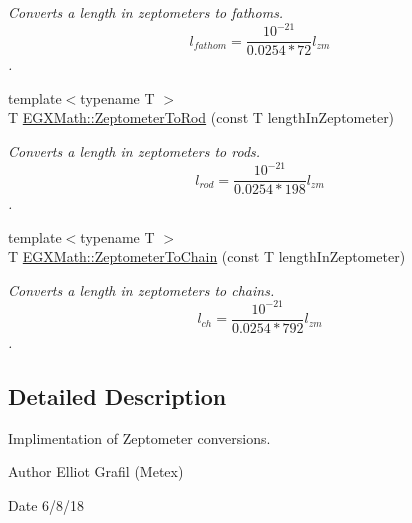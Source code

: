 \begin{DoxyCompactItemize}
\begin{DoxyCompactList}\small\item\em Converts a length in zeptometers to fathoms. \[ l_{fathom}= \frac{10^{-21}}{0.0254 * 72} l_{zm} \]. \end{DoxyCompactList}\item 
{\footnotesize template$<$typename T $>$ }\\T \mbox{\hyperlink{group___e_g_x_math-_conversions-_length_conversions-_s_i-_zeptometer-_surveyors_gac0c6193e55739ec7f4c3769ebddb65e2}{E\+G\+X\+Math\+::\+Zeptometer\+To\+Rod}} (const T length\+In\+Zeptometer)
\begin{DoxyCompactList}\small\item\em Converts a length in zeptometers to rods. \[ l_{rod}= \frac{10^{-21}}{0.0254 * 198} l_{zm} \]. \end{DoxyCompactList}\item 
{\footnotesize template$<$typename T $>$ }\\T \mbox{\hyperlink{group___e_g_x_math-_conversions-_length_conversions-_s_i-_zeptometer-_surveyors_gaf9fce38080eb9c090004c9df2a5dead1}{E\+G\+X\+Math\+::\+Zeptometer\+To\+Chain}} (const T length\+In\+Zeptometer)
\begin{DoxyCompactList}\small\item\em Converts a length in zeptometers to chains. \[ l_{ch}= \frac{10^{-21}}{0.0254 * 792} l_{zm} \]. \end{DoxyCompactList}\end{DoxyCompactItemize}


\subsection{Detailed Description}
Implimentation of Zeptometer conversions. 

\begin{DoxyAuthor}{Author}
Elliot Grafil (Metex) 
\end{DoxyAuthor}
\begin{DoxyDate}{Date}
6/8/18 
\end{DoxyDate}
